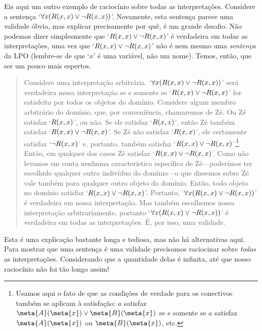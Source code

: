 Eis aqui um outro exemplo de raciocínio sobre todas as interpretações.
Considere a sentença `$\forall x(\mathord{R}(x,x)\vee\neg \mathord{R}(x,x))$'.
Novamente, esta sentença parece uma validade óbvia, mas explicar precisamente por quê, é um grande desafio.
Não podemos dizer simplesmente que `$\mathord{R}(x,x) \vee\neg \mathord{R}(x,x)$' é verdadeira em todas as interpretações, uma vez que `$\mathord{R}(x,x) \vee\neg \mathord{R}(x,x)$' não é nem mesmo uma \emph{sentença} da LPO (lembre-se de que `$x$' é uma variável, não um nome).
Temos, então, que ser um pouco mais espertos.
	\begin{quote}
		Considere uma interpretação arbitrária.
		`$\forall x(\mathord{R}(x,x)\vee \neg\mathord{R}(x,x))$' será verdadeira nessa interpretação se e somente se `$\mathord{R}(x,x)\vee\neg\mathord{R}(x,x)$' for satisfeita por todos os objetos do domínio.
		Considere algum membro arbitrário do domínio, que, por conveniência, chamaremos de Zé.
		Ou Zé satisfaz `$\mathord{R}(x,x)$', ou não.
		Se ele satisfaz `$\mathord{R}(x,x)$', então Zé também satisfaz `$\mathord{R}(x,x)\vee\neg\mathord{R}(x,x)$'.
		Se Zé não satisfaz `$\mathord{R}(x,x)$', ele certamente satisfaz `$\neg\mathord{R}(x,x)$' e, portanto, também satisfaz `$\mathord{R}(x,x)\vee\neg\mathord{R}(x,x)$'.\footnote{
			Usamos aqui o fato de que as condições de verdade para os conectivos também se aplicam à satisfação:
		$a$ satisfaz $\meta{A}(\meta{x}) \lor \meta{B}(\meta{x})$ se e somente se $a$ satisfaz $\meta{A}(\meta{x})$ ou $\meta{B}(\meta{x})$, etc.
		}
		Então, em qualquer dos casos Zé satisfaz `$\mathord{R}(x,x) \vee\neg \mathord{R}(x,x)$'.
		Como não levamos em conta nenhuma característica específica de Zé---poderímos ter escolhido qualquer outro indivíduo do domínio---o que dissemos sobre Zé vale também para qualquer outro objeto do domínio.
		Então, todo objeto no domínio satisfaz `$\mathord{R}(x,x)\vee\neg\mathord{R}(x,x)$'.
		Portanto, `$\forall x (\mathord{R}(x,x) \vee\neg \mathord{R}(x,x))$' é verdadeira em nossa interpretação.
		Mas também escolhemos nossa interpretação arbitrariamente, portanto `$\forall x (\mathord{R}(x,x) \vee\neg \mathord{R}(x,x))$' é verdadeira em todas as interpretações.
		É, por isso, uma validade.
	\end{quote}
Esta é uma explicação bastante longa e tediosa, mas não há alternativas aqui. Para mostrar que uma sentença é uma validade precisamos raciocinar sobre \emph{todas} as interpretações.
Considerando que a quantidade delas é infinita, até que nosso raciocínio não foi tão longo assim!


